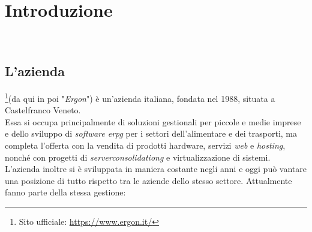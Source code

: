 
\chapter{Introduzione}
\label{cap:introduzione}

\noindent {}\\





\section{L'azienda}

\noindent{\myCompany}\footnote[1]{Sito ufficiale: \url{https://www.ergon.it/}}(da qui in poi "\textit{Ergon}") è un'azienda italiana, fondata nel 1988, 
situata a Castelfranco Veneto.\\
Essa si occupa principalmente di soluzioni gestionali per piccole e medie imprese e dello sviluppo di \textit{software \gls{erpg}} per i settori dell'alimentare e dei trasporti,
ma completa l'offerta con la vendita di prodotti hardware, servizi \textit{web} e \textit{hosting}, nonché con progetti di \textit{\gls{serverconsolidationg}} e virtualizzazione di
sistemi.
L'azienda inoltre si è sviluppata in maniera costante negli anni e oggi può vantare una posizione di tutto rispetto tra le aziende dello stesso settore.
Attualmente fanno parte della stessa gestione:

